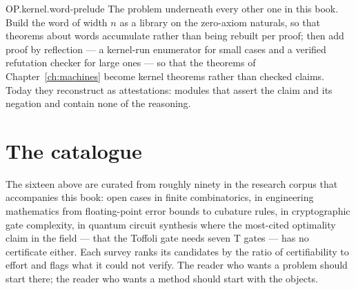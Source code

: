 \begin{artifact}{OP.kernel.word-prelude}
The problem underneath every other one in this book. Build the word of width \(n\) as a library on the zero-axiom naturals, so that theorems about words accumulate rather than being rebuilt per proof; then add proof by reflection --- a kernel-run enumerator for small cases and a verified refutation checker for large ones --- so that the theorems of Chapter~\ref{ch:machines} become kernel theorems rather than checked claims. Today they reconstruct as attestations: modules that assert the claim and its negation and contain none of the reasoning.
\end{artifact}

\section{The catalogue}

The sixteen above are curated from roughly ninety in the research corpus that accompanies this book: open cases in finite combinatorics, in engineering mathematics from floating-point error bounds to cubature rules, in cryptographic gate complexity, in quantum circuit synthesis where the most-cited optimality claim in the field --- that the Toffoli gate needs seven T gates --- has no certificate either. Each survey ranks its candidates by the ratio of certifiability to effort and flags what it could not verify. The reader who wants a problem should start there; the reader who wants a method should start with the objects.
